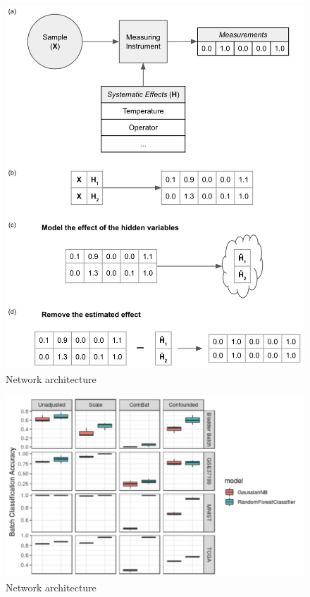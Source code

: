 \documentclass[notitlepage]{article}
\begin{document}
\begin{figure}
	\centering
	\includegraphics[width=4.5in]{figures/rough/adjuster_workflow}
	\caption{Network architecture}
	\label{simulationfigure}
\end{figure}
\begin{figure}
	\centering
	\includegraphics[width=4.5in]{figures/rough/batch_accuracy}
	\caption{Network architecture}
	\label{simulationfigure}
\end{figure}
\end{document}
